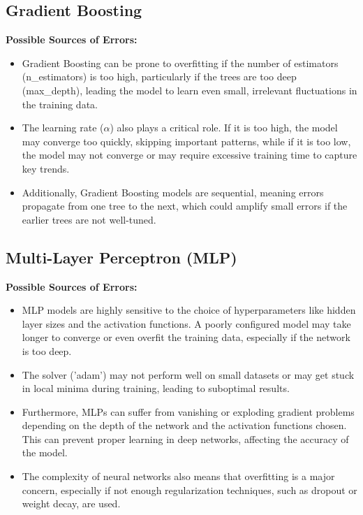\documentclass[12pt]{report}
\begin{document}
\subsection{Gradient Boosting}


\textbf{Possible Sources of Errors:} 
\begin{itemize}
    \item Gradient Boosting can be prone to overfitting if the number of estimators (n\_estimators) is too high, particularly if the trees are too deep (max\_depth), leading the model to learn even small, irrelevant fluctuations in the training data.
    \item The learning rate (\( \alpha \)) also plays a critical role. If it is too high, the model may converge too quickly, skipping important patterns, while if it is too low, the model may not converge or may require excessive training time to capture key trends.
    \item Additionally, Gradient Boosting models are sequential, meaning errors propagate from one tree to the next, which could amplify small errors if the earlier trees are not well-tuned.
\end{itemize}

\subsection{Multi-Layer Perceptron (MLP)}


\textbf{Possible Sources of Errors:} 
\begin{itemize}
    \item MLP models are highly sensitive to the choice of hyperparameters like hidden layer sizes and the activation functions. A poorly configured model may take longer to converge or even overfit the training data, especially if the network is too deep.
    \item The solver ('adam') may not perform well on small datasets or may get stuck in local minima during training, leading to suboptimal results.
    \item Furthermore, MLPs can suffer from vanishing or exploding gradient problems depending on the depth of the network and the activation functions chosen. This can prevent proper learning in deep networks, affecting the accuracy of the model.
    \item The complexity of neural networks also means that overfitting is a major concern, especially if not enough regularization techniques, such as dropout or weight decay, are used.
\end{itemize}
\end{document}
